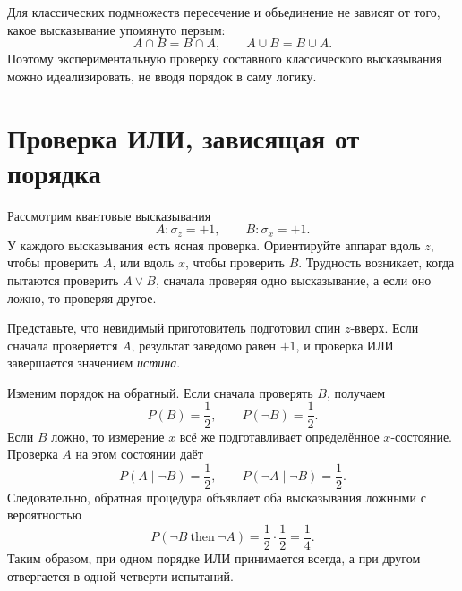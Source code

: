 Для классических подмножеств пересечение и объединение не зависят от того, какое высказывание упомянуто первым:
\[
A\cap B=B\cap A,\qquad A\cup B=B\cup A.
\]
Поэтому экспериментальную проверку составного классического высказывания можно идеализировать, не вводя порядок в саму логику.

\section{Проверка ИЛИ, зависящая от порядка}

Рассмотрим квантовые высказывания
\begin{equation}
A:\sigma_z=+1,\qquad B:\sigma_x=+1.
\end{equation}
У каждого высказывания есть ясная проверка. Ориентируйте аппарат вдоль \(z\), чтобы проверить \(A\), или вдоль \(x\), чтобы проверить \(B\). Трудность возникает, когда пытаются проверить \(A\lor B\), сначала проверяя одно высказывание, а если оно ложно, то проверяя другое.

Представьте, что невидимый приготовитель подготовил спин \(z\)-вверх. Если сначала проверяется \(A\), результат заведомо равен \(+1\), и проверка ИЛИ завершается значением \emph{истина}.

Изменим порядок на обратный. Если сначала проверять \(B\), получаем
\[
P(B)=\frac12,\qquad P(\neg B)=\frac12.
\]
Если \(B\) ложно, то измерение \(x\) всё же подготавливает определённое \(x\)-состояние. Проверка \(A\) на этом состоянии даёт
\[
P(A\mid \neg B)=\frac12,\qquad
P(\neg A\mid \neg B)=\frac12.
\]
Следовательно, обратная процедура объявляет оба высказывания ложными с вероятностью
\begin{equation}
P(\neg B\ \text{then}\ \neg A)
=\frac12\cdot\frac12=\frac14.
\end{equation}
Таким образом, при одном порядке ИЛИ принимается всегда, а при другом отвергается в одной четверти испытаний.

\begin{classroomqa}
\end{classroomqa}

